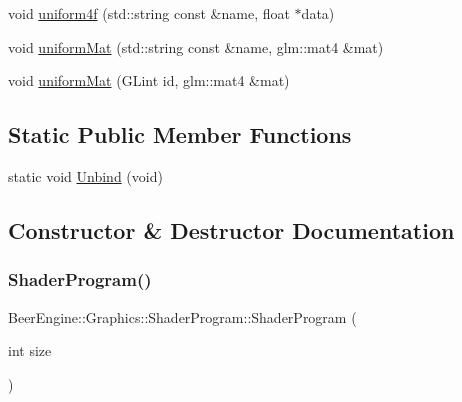 \begin{DoxyCompactItemize}
\item 
void \mbox{\hyperlink{class_beer_engine_1_1_graphics_1_1_shader_program_aea02b6f42e752a49ca5ac8b6be19732b}{uniform4f}} (std\+::string const \&name, float $\ast$data)
\item 
void \mbox{\hyperlink{class_beer_engine_1_1_graphics_1_1_shader_program_aefc5f7af9799e46a5c9efc4a84c43915}{uniform\+Mat}} (std\+::string const \&name, glm\+::mat4 \&mat)
\item 
void \mbox{\hyperlink{class_beer_engine_1_1_graphics_1_1_shader_program_a0269320ff9aab4c4834f4a66d77ae028}{uniform\+Mat}} (G\+Lint id, glm\+::mat4 \&mat)
\end{DoxyCompactItemize}
\subsection*{Static Public Member Functions}
\begin{DoxyCompactItemize}
\item 
static void \mbox{\hyperlink{class_beer_engine_1_1_graphics_1_1_shader_program_a717ce011d4f4f59037baa45a31d6a214}{Unbind}} (void)
\end{DoxyCompactItemize}


\subsection{Constructor \& Destructor Documentation}
\mbox{\label{class_beer_engine_1_1_graphics_1_1_shader_program_aee2fd393bbe665f1d6d1d4389242490e}} 
\subsubsection{\texorpdfstring{Shader\+Program()}{ShaderProgram()}}
{\footnotesize\ttfamily Beer\+Engine\+::\+Graphics\+::\+Shader\+Program\+::\+Shader\+Program (\begin{DoxyParamCaption}\item[{int}]{size }\end{DoxyParamCaption})}

\mbox{\label{class_beer_engine_1_1_graphics_1_1_shader_program_adce6fa1e441965862456330f4f3f4de4}} 

